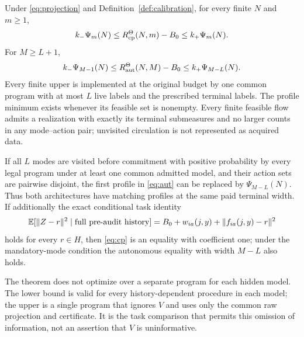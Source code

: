 \begin{theorem}\label{thm:transfer}
Under \eqref{eq:projection} and Definition~\ref{def:calibration}, for every finite $N$ and $m\ge1$,
\begin{equation}\label{eq:cp}
 k_-\Psi_m(N)\le R_{\mathrm{cp}}^\Theta(N,m)-B_0\le k_+\Psi_m(N).
\end{equation}
For $M\ge L+1$,
\begin{equation}\label{eq:aut}
 k_-\Psi_{M-1}(N)\le R_{\mathrm{aut}}^\Theta(N,M)-B_0
       \le k_+\Psi_{M-L}(N).
\end{equation}
Every finite upper is implemented at the original budget by one common program with at most $L$ live labels and the prescribed terminal labels. The profile minimum exists whenever its feasible set is nonempty. Every finite feasible flow admits a realization with exactly its terminal submeasures and no larger counts in any mode--action pair; unvisited circulation is not represented as acquired data.

If all $L$ modes are visited before commitment with positive probability by every legal program under at least one common admitted model, and their action sets are pairwise disjoint, the first profile in \eqref{eq:aut} can be replaced by $\Psi_{M-L}(N)$. Thus both architectures have matching profiles at the same paid terminal width. If additionally the exact conditional task identity
\begin{equation}\label{eq:exact-risk}
 \mathbb E[\|Z-r\|^2\mid\text{full pre-audit history}]
   =B_0+w_{ia}(j,y)+\|f_{ia}(j,y)-r\|^2
\end{equation}
holds for every $r\in H$, then \eqref{eq:cp} is an equality with coefficient one; under the mandatory-mode condition the autonomous equality with width $M-L$ also holds.
\end{theorem}

The theorem does not optimize over a separate program for each hidden model. The lower bound is valid for every history-dependent procedure in each model; the upper is a single program that ignores $V$ and uses only the common raw projection and certificate. It is the task comparison that permits this omission of information, not an assertion that $V$ is uninformative.

